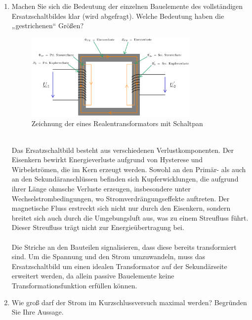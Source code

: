 \begin{enumerate}[label=\alph*)]
	      \pagebreak
	\item Machen Sie sich die Bedeutung der einzelnen Bauelemente des vollständigen
	      Ersatzschaltbildes klar (wird abgefragt). Welche Bedeutung haben die
	      „gestrichenen“ Größen?
	      \begin{figure}[h!]
		      \begin{center}
			      \includegraphics[width=0.8\textwidth]{img/2.1.2.4.png}
		      \end{center}
		      \caption{Zeichnung der eines Realentransformators mit Schaltpan }\label{img/2.1.2.4}
	      \end{figure}
	      \\
	      Das Ersatzschaltbild besteht aus verschiedenen Verlustkomponenten. Der Eisenkern bewirkt
	      Energieverluste aufgrund von Hysterese und Wirbelströmen, die im Kern erzeugt werden. Sowohl
	      an den Primär- als auch an den Sekundäranschlüssen befinden sich Kupferwicklungen, die aufgrund
	      ihrer Länge ohmsche Verluste erzeugen, insbesondere unter Wechselstrombedingungen, wo Stromverdrängungseffekte
	      auftreten. Der magnetische Fluss erstreckt sich nicht nur durch den Eisenkern, sondern breitet sich auch durch
	      die Umgebungsluft aus, was zu einem Streufluss führt. Dieser Streufluss trägt nicht zur Energieübertragung bei.\\ \ \\

	      Die Striche an den Bauteilen signalisieren, dass diese bereits transformiert
	      sind. Um die Spannung und den Strom umzuwandeln, muss das Ersatzschaltbild um
	      einen idealen Transformator auf der Sekundärseite erweitert werden, da allein
	      passive Bauelemente keine Transformationsfunktion erfüllen können.\\

	\item Wie groß darf der Strom im Kurzschlussversuch maximal werden? Begründen Sie
	      Ihre Aussage.\\ \ \\


\end{enumerate}
